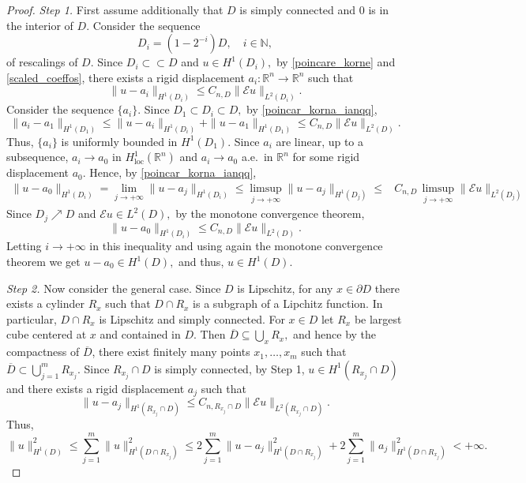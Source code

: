 \documentclass[reqno]{amsart}
\numberwithin{equation}{section}
\theoremstyle{plain}
\theoremstyle{definition}
\newcommand{\R}{\mathbb{R}}
\newcommand{\N}{\mathbb{N}}
\newcommand{\p}{\partial}
\newcommand{\cl}[1]{\overline{#1}}
\newcommand{\strictlyincluded}{\subset\subset}
\newcommand{\loc}{\mathrm{loc}}
\newcommand{\str}[1]{\mathcal{E}#1}
\begin{document}
\begin{proof}
{\it Step 1.} First assume additionally that $D$ is simply connected and $0$ is in the interior of $D.$  
Consider  the sequence
$$
D_i=(1-2^{-i})D,\quad i\in\N,
$$
of rescalings of $D.$ Since $D_i\strictlyincluded D$ and $u\in H^1(D_i),$ by \eqref{poincare_korne} and \eqref{scaled_coeffos}, there exists a rigid displacement $a_i:\R^n\to\R^n$ such that
\begin{equation}\label{poincar_korna_ianqq}
\|u-a_i\|_{H^1(D_i)} \le C_{n,D}\|\str{u}\|_{L^2(D_i)}. 
\end{equation}
%
Consider the sequence $\{a_i\}.$ Since $D_1\subset D_i\subset D,$ by \eqref{poincar_korna_ianqq},
$$
\|a_i-a_1\|_{H^1(D_1)} \le \|u-a_i\|_{H^1(D_i)} + \|u-a_1\|_{H^1(D_1)}  \le  C_{n,D}\|\str{u}\|_{L^2(D)}.
$$
Thus, $\{a_i\}$ is uniformly bounded in $H^1(D_1).$ Since $a_i$ are linear, up to a subsequence, $a_i\to a_0$ in $H_\loc^1(\R^n)$ and $a_i\to a_0$ a.e.\  in $\R^n$ for some rigid displacement $a_0.$ Hence, by \eqref{poincar_korna_ianqq},
\begin{align*}
\|u-a_0\|_{H^1(D_i)} = \lim\limits_{j\to+\infty} \|u-a_j\|_{H^1(D_i)} \le \limsup\limits_{j\to+\infty} \|u-a_j\|_{H^1(D_j)} 
\le & C_{n,D}\,\limsup\limits_{j\to+\infty} \|\str{u}\|_{L^2(D_j)}
\end{align*}
Since $D_j\nearrow D$ and $\str{u}\in L^2(D),$ by the monotone convergence theorem,
$$
\|u-a_0\|_{H^1(D_i)}  \le C_{n,D}\|\str{u}\|_{L^2(D)}.
$$
Letting $i\to+\infty$ in this inequality and using again the monotone convergence theorem we get 
$
u-a_0\in H^1(D),
$ and thus, $u\in H^1(D).$
\smallskip

{\it Step 2.} Now consider the general case.  Since $D$ is Lipschitz, for any $x\in \p D$ there exists a cylinder $R_x$ such that $D\cap R_x$ is a subgraph of a Lipchitz function. In particular, $D\cap R_x$ is Lipschitz and simply connected. For $x\in D$ let $R_x$ be largest cube centered at $x$ and contained in $D.$ Then 
$\cl{D} \subseteq \bigcup_x R_x,$ and hence by the compactness of $\cl{D}$, there exist  finitely many points $x_1,\ldots,x_m$ such that $\cl{D} \subset \bigcup_{j=1}^m R_{x_j}.$ Since $R_{x_j}\cap D$ is simply connected, by Step 1, $u\in H^1(R_{x_j}\cap D)$ and there exists a rigid displacement $a_j$ such that
$$
\|u - a_j\|_{H^1(R_{x_j}\cap D)} \le C_{n,R_{x_j}\cap D}
\|\str{u}\|_{L^2(R_{x_j}\cap D)}.
$$
Thus,
$$
\|u\|_{H^1(D)}^2 \le 
\sum\limits_{j=1}^m \|u\|_{H^1(D\cap R_{x_j})}^2
\le 
2\sum\limits_{j=1}^m \|u - a_j\|_{H^1(D\cap R_{x_j})}^2 
+
2\sum\limits_{j=1}^m \|a_j\|_{H^1(D\cap R_{x_j})}^2 <+\infty.
$$
\end{proof}
\end{document}

